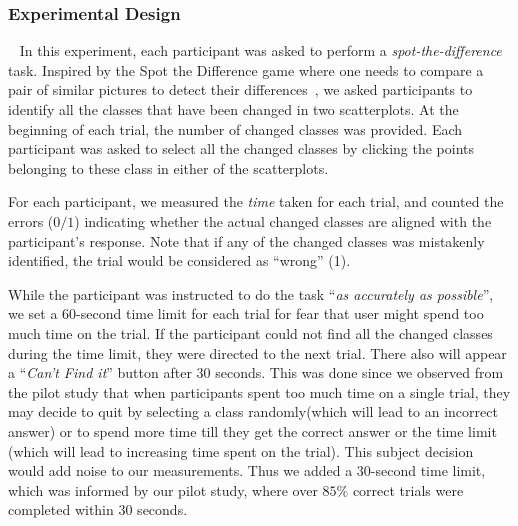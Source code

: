 \subsubsection{Experimental Design}
\
\newline
\vspace{.3em}
In this experiment, each participant was asked to perform a \emph{spot-the-difference} task. Inspired by the Spot the Difference game where one needs to compare a pair of similar pictures to detect their differences~\cite{Fukuba2009}, we asked participants to identify all the classes that have been changed in two scatterplots. At the beginning of each trial, the number of changed classes was provided. Each participant was asked to select all the changed classes by clicking the points belonging to these class in either of the scatterplots.

For each participant, we measured the \emph{time} taken for each trial, and counted the errors ($0/1$) indicating whether the actual changed classes are aligned with the participant's response. Note that if any of the changed classes was mistakenly identified, the trial would be considered as ``wrong'' (1).

While the participant was instructed to do the task ``\emph{as accurately as possible}'', we set a $60$-second time limit for each trial for fear that user might spend too much time on the trial. If the participant could not find all the changed classes during the time limit, they were directed to the next trial. There also will appear a ``\emph{Can't Find it}'' button after $30$ seconds.
This was done since we observed from the pilot study that when participants spent too much time on a single trial, they may decide to quit by selecting a class randomly(which will lead to an incorrect answer) or to spend more time till they get the correct answer or the time limit (which will lead to increasing time spent on the trial). This subject decision would add noise to our measurements. Thus we added a $30$-second time limit, which was informed by our pilot study, where over $85\%$ correct trials were completed within $30$ seconds.

